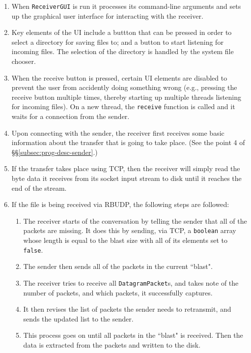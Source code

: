 \documentclass[10pt, a4paper]{article}
\begin{document}
\begin{enumerate}
  \item When \texttt{ReceiverGUI} is run it processes its command-line arguments
    and sets up the graphical user interface for interacting with the receiver.
  \item Key elements of the UI include a buttton that can be pressed in order
    to select a directory for saving files to; and a button to start listening
    for incoming files. The selection of the directory is handled by the system
    file chooser.
  \item When the receive button is pressed, certain UI elements are disabled to
    prevent the user from accidently doing something wrong (e.g., pressing the
    receive button multiple times, thereby starting up multiple threads
    listening for incoming files). On a new thread, the \texttt{receive}
    function is called and it waits for a connection from the sender.
  \item Upon connecting with the sender, the receiver first receives some basic
    information about the transfer that is going to take place. (See the point 4
    of \S\S\ref{subsec:prog-desc-sender}.)
  \item If the transfer takes place using TCP, then the receiver will simply
    read the byte data it receives from its socket input stream to disk until it
    reaches the end of the stream.
  \item If the file is being received via RBUDP, the following steps are
    followed:
    \begin{enumerate}
      \item The receiver starts of the conversation by telling the sender that
        all of the packets are missing. It does this by sending, via TCP, a
        \texttt{boolean} array whose length is equal to the blast size with
        all of its elements set to \texttt{false}.
      \item The sender then sends all of the packets in the current ``blast".
      \item The receiver tries to receive all \texttt{DatagramPacket}s, and
        takes note of the number of packets, and which packets, it successfully
        captures.
      \item It then revises the list of packets the sender needs to retransmit,
        and sends the updated list to the sender.
      \item This process goes on until all packets in the ``blast" is received.
        Then the data is extracted from the packets and written to the disk.

\end{enumerate}
\end{enumerate}
\end{document}
